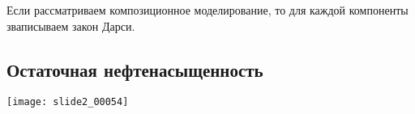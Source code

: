 \documentclass[main.tex]{subfiles}
\begin{document}
Если рассматриваем композиционное моделирование, то для каждой компоненты зваписываем закон Дарси.




\subsection{Остаточная нефтенасыщенность}

\texttt{[image: slide2\_00054]}




\end{document}
